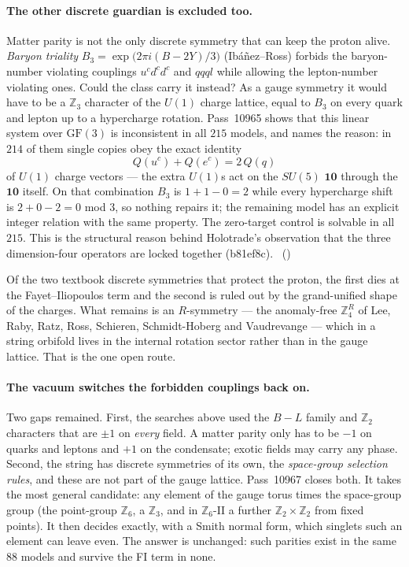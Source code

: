\paragraph{The other discrete guardian is excluded too.}
Matter parity is not the only discrete symmetry that can keep the proton alive. \emph{Baryon
triality} $B_3=\exp\bigl(2\pi i(B-2Y)/3\bigr)$ (Ib\'a\~nez--Ross) forbids the baryon-number
violating couplings $u^cd^cd^c$ and $qqql$ while allowing the lepton-number violating ones.
Could the class carry it instead? As a gauge symmetry it would have to be a $\mathbb{Z}_3$
character of the $U(1)$ charge lattice, equal to $B_3$ on every quark and lepton up to a
hypercharge rotation. Pass~10965 shows that this linear system over $\mathrm{GF}(3)$ is
inconsistent in all $215$ models, and names the reason: in $214$ of them single copies obey
the exact identity
\[
  Q(u^c)+Q(e^c)=2\,Q(q)
\]
of $U(1)$ charge vectors --- the extra $U(1)$s act on the $SU(5)$ $\mathbf{10}$ through the
$\mathbf{10}$ itself. On that combination $B_3$ is $1+1-0=2$ while every hypercharge shift is
$2+0-2=0$ mod $3$, so nothing repairs it; the remaining model has an explicit integer
relation with the same property. The zero-target control is solvable in all $215$. This is
the structural reason behind Holotrade's observation that the three dimension-four operators
are locked together (b81ef8c). \tierC\ ()

\begin{plainwords}
Of the two textbook discrete symmetries that protect the proton, the first dies at the
Fayet--Iliopoulos term and the second is ruled out by the grand-unified shape of the
charges. What remains is an $R$-symmetry --- the anomaly-free $\mathbb{Z}_4^R$ of Lee, Raby,
Ratz, Ross, Schieren, Schmidt-Hoberg and Vaudrevange --- which in a string orbifold lives in the
internal rotation sector rather than in the gauge lattice. That is the one open route.
\end{plainwords}

\paragraph{The vacuum switches the forbidden couplings back on.}
Two gaps remained. First, the searches above used the $B-L$ family and $\mathbb{Z}_2$ characters
that are $\pm1$ on \emph{every} field. A matter parity only has to be $-1$ on quarks and leptons
and $+1$ on the condensate; exotic fields may carry any phase. Second, the string has discrete
symmetries of its own, the \emph{space-group selection rules}, and these are not part of the gauge
lattice. Pass~10967 closes both. It takes the most general candidate: any element of the gauge
torus times the space-group group (the point-group $\mathbb{Z}_6$, a $\mathbb{Z}_3$, and in
$\mathbb{Z}_6$-II a further $\mathbb{Z}_2\times\mathbb{Z}_2$ from fixed points). It then decides
exactly, with a Smith normal form, which singlets such an element can leave even. The answer is
unchanged: such parities exist in the same $88$ models and survive the FI term in none.

